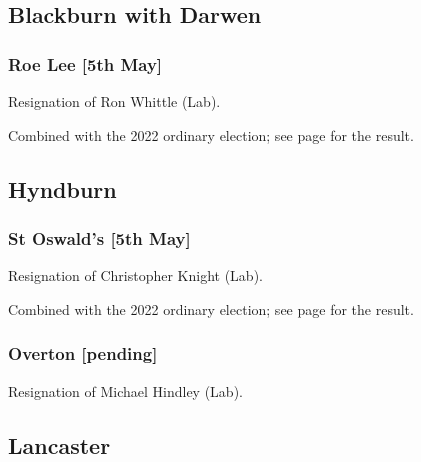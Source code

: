 \documentclass[a4paper,openany]{book}
\begin{document}
\begin{resultsiii}
\subsection*{Blackburn with Darwen}

\subsubsection*{Roe Lee \hspace*{\fill}\nolinebreak[1]%
	\enspace\hspace*{\fill}
	[5th May]}


Resignation of Ron Whittle (Lab).

Combined with the 2022 ordinary election; see page \pageref{BlackburnDarwenRoeLee} for the result.

\subsection*{Hyndburn}

\subsubsection*{St Oswald's \hspace*{\fill}\nolinebreak[1]%
	\enspace\hspace*{\fill}
	[5th May]}


Resignation of Christopher Knight (Lab).

Combined with the 2022 ordinary election; see page \pageref{HyndburnStOswalds} for the result.

\subsubsection*{Overton \hspace*{\fill}\nolinebreak[1]%
	\enspace\hspace*{\fill}
	[pending]}


Resignation of Michael Hindley (Lab).

\subsection*{Lancaster}


\end{resultsiii}
\end{document}
